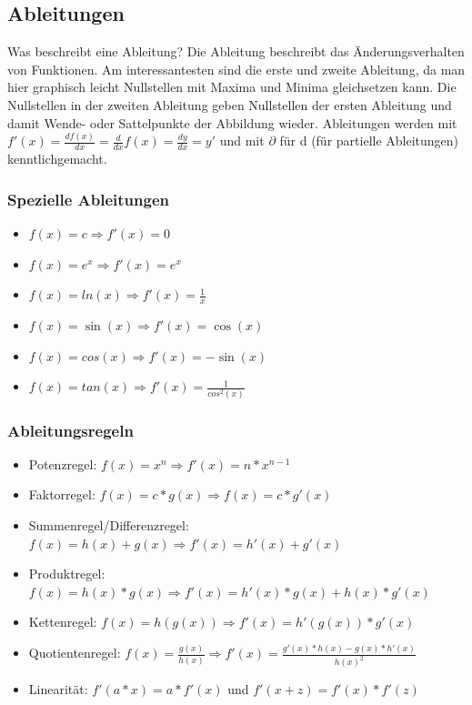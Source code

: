 \documentclass[letterpaper, titlepage]{article}
\begin{document}
\subsection{Ableitungen}\label{Ableitungen}
Was beschreibt eine Ableitung? Die Ableitung beschreibt das Änderungsverhalten von Funktionen. Am interessantesten sind die erste und zweite Ableitung, da man hier graphisch leicht Nullstellen mit Maxima und Minima gleichsetzen kann. Die Nullstellen in der zweiten Ableitung geben Nullstellen der ersten Ableitung und damit Wende- oder Sattelpunkte der Abbildung wieder. Ableitungen werden mit $f'(x) = \frac{d f(x)}{dx} = \frac{d}{dx}f(x) = \frac{dy}{dx} = y'$ und mit $\partial$ für d (für partielle Ableitungen) kenntlichgemacht. 
\subsubsection{Spezielle Ableitungen}\label{Spezielle Ableitungen}
\begin{itemize}
    \item $f(x)=c \Rightarrow f'(x)=0$
    \item $f(x)=e^x \Rightarrow f'(x)=e^x$
    \item $f(x)=ln(x) \Rightarrow f'(x)=\frac{1}{x}$
    \item $f(x)=\sin(x) \Rightarrow f'(x)=\cos(x)$
    \item $f(x)=cos(x) \Rightarrow f'(x)=-\sin(x)$
    \item $f(x)=tan(x) \Rightarrow f'(x)=\frac{1}{cos^2(x)}$
\end{itemize}

\subsubsection{Ableitungsregeln}\label{Ableitungsregeln}
\begin{itemize}
    \item Potenzregel: $f(x)=x^n \Rightarrow f'(x)=n*x^{n-1}$
    \item Faktorregel: $f(x)=c*g(x) \Rightarrow f(x)=c*g'(x)$
    \item Summenregel/Differenzregel: $f(x)=h(x)+g(x) \Rightarrow f'(x)=h'(x)+g'(x)$
    \item Produktregel: $f(x)=h(x)*g(x) \Rightarrow f'(x)=h'(x)*g(x)+h(x)*g'(x)$
    \item Kettenregel: $f(x)=h(g(x)) \Rightarrow f'(x)=h'(g(x))*g'(x)$
    \item Quotientenregel: $f(x)=\frac{g(x)}{h(x)} \Rightarrow f'(x)=\frac{g'(x)*h(x)-g(x)*h'(x)}{h(x)^2} $
    \item Linearität: $f'(a*x)=a*f'(x)$ und $f'(x+z)=f'(x)*f'(z)$
\end{itemize}
\end{document}
